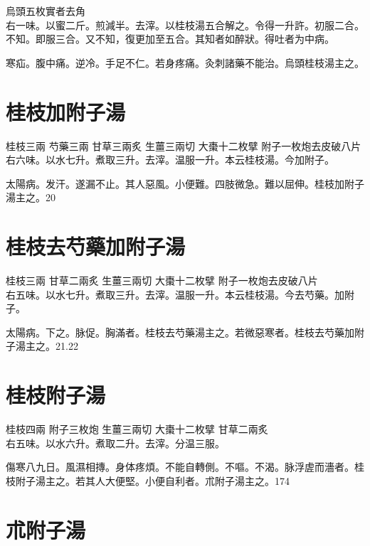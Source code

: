 \documentclass[b5paper,twoside,zihao=-4,UTF8]{ctexbook}
\begin{document}
烏頭{\scriptsize 五枚實者去角}\\
右一味。以蜜二斤。煎減半。去滓。以桂枝湯五合解之。令得一升許。初服二合。不知。即服三合。又不知，復更加至五合。其知者如醉狀。得吐者为中病。

寒疝。腹中痛。逆冷。手足不仁。若身疼痛。灸刺諸藥不能治。烏頭桂枝湯主之。

\section{桂枝加附子湯}

桂枝{\scriptsize 三兩} 芍藥{\scriptsize 三兩} 甘草{\scriptsize 三兩炙} 生薑{\scriptsize 三兩切} 大棗{\scriptsize 十二枚擘} 附子{\scriptsize 一枚炮去皮破八片}\\
右六味。以水七升。煮取三升。去滓。温服一升。本云桂枝湯。今加附子。

太陽病。发汗。遂漏不止。其人惡風。小便難。四肢微急。難以屈伸。桂枝加附子湯主之。20

\section{桂枝去芍藥加附子湯}

桂枝{\scriptsize 三兩} 甘草{\scriptsize 二兩炙} 生薑{\scriptsize 三兩切} 大棗{\scriptsize 十二枚擘} 附子{\scriptsize 一枚炮去皮破八片}\\
右五味。以水七升。煮取三升。去滓。温服一升。本云桂枝湯。今去芍藥。加附子。

太陽病。下之。脉促。胸滿者。桂枝去芍藥湯主之。若微{惡}寒者。桂枝去芍藥加附子湯主之。21.22

\section{桂枝附子湯}

桂枝{\scriptsize 四兩} 附子{\scriptsize 三枚炮} 生薑{\scriptsize 三兩切} 大棗{\scriptsize 十二枚擘} 甘草{\scriptsize 二兩炙}\\
右五味。以水六升。煮取二升。去滓。分温三服。

傷寒八九日。風濕相摶。身体疼煩。不能自轉側。不嘔。不渴。脉浮虗而濇者。桂枝附子湯主之。若其人大便堅。小便自利者。朮附子湯主之。174

\section{朮附子湯}
\end{document}
